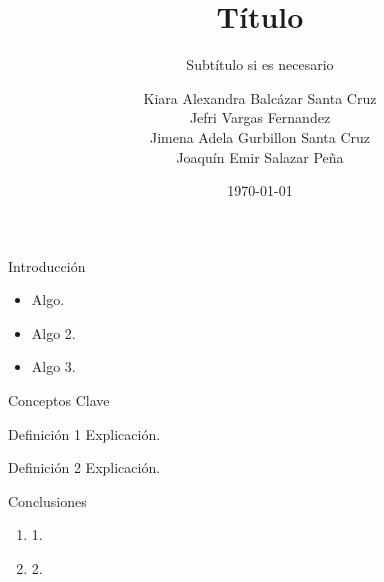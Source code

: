 \documentclass{beamer}
\title[Título]{Título}
\subtitle{Subtítulo si es necesario}
\author[Balcázar, Vargas, Gurbillon, Salazar]{
    Kiara Alexandra Balcázar Santa Cruz \\
    Jefri Vargas Fernandez \\
    Jimena Adela Gurbillon Santa Cruz \\
    Joaquín Emir Salazar Peña
}
\institute[Universidad]{UTEC}
\date{\today}
\begin{document}
\begin{frame}
    \titlepage
\end{frame}

\begin{frame}{Introducción}
    \begin{itemize}
        \item Algo.
        \item Algo 2.
        \item Algo 3.
    \end{itemize}
\end{frame}

\begin{frame}{Conceptos Clave}
    \begin{block}{Definición 1}
        Explicación.
    \end{block}
    
    \begin{block}{Definición 2}
        Explicación.
    \end{block}
\end{frame}

\begin{frame}{Conclusiones}
    \begin{enumerate}
        \item 1.
        \item 2.
    \end{enumerate}
\end{frame}
\end{document}
